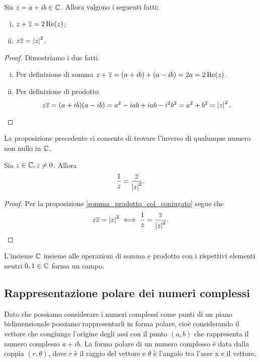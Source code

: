 \begin{proposition}\label{somma_prodotto_col_coniugato}
    Sia $z = a+ib \in \mathbb{C}$. Allora valgono i seguenti fatti:
    \begin{enumerate}[(i)]
        \item $z + \overline{z} = 2\operatorname{Re}(z)$;
        \item $z\overline{z} = \left|z\right|^2$.
    \end{enumerate}
\end{proposition}
\begin{proof}
    Dimostriamo i due fatti.
    \begin{enumerate}[(i)]
        \item Per definizione di somma $z + \overline{z} = (a + ib) + (a - ib) = 2a = 2\operatorname{Re}(z)$.
        \item Per definizione di prodotto \[
            z\overline{z} = (a + ib)(a - ib) = a^2 - iab + iab - i^2b^2 = a^2 + b^2 = \left|z\right|^2.\qedhere
        \] 
    \end{enumerate}
\end{proof}

La proposizione precedente ci consente di trovare l'inverso di qualunque numero non nullo in $\mathbb{C}$.

\begin{proposition}
    Sia $z \in \mathbb{C}, z \neq 0$. Allora \[\frac{1}{z} = \frac{\overline{z}}{\left|z\right|^2}.\]
\end{proposition}
\begin{proof}
    Per la proposizione \ref{somma_prodotto_col_coniugato} segue che \[
        z\overline{z} = \left|z\right|^2 \iff \frac{1}{z} = \frac{\overline{z}}{\left|z\right|^2}. \qedhere   
    \]
\end{proof}

\begin{proposition}
    L'insieme $\mathbb{C}$ insieme alle operazioni di somma e prodotto con i rispettivi elementi neutri $0, 1 \in \mathbb{C}$ forma un campo.
\end{proposition}

\subsection{Rappresentazione polare dei numeri complessi}

Dato che possiamo considerare i numeri complessi come punti di un piano bidimensionale possiamo rappresentarli in forma polare, cioè considerando il vettore che congiunge l'origine degli assi con il punto $(a, b)$ che rappresenta il numero complesso $a + ib$. La forma polare di un numero complesso è data dalla coppia $(r, \theta)$, dove $r$ è il raggio del vettore e $\theta$ è l'angolo tra l'asse x e il vettore.

